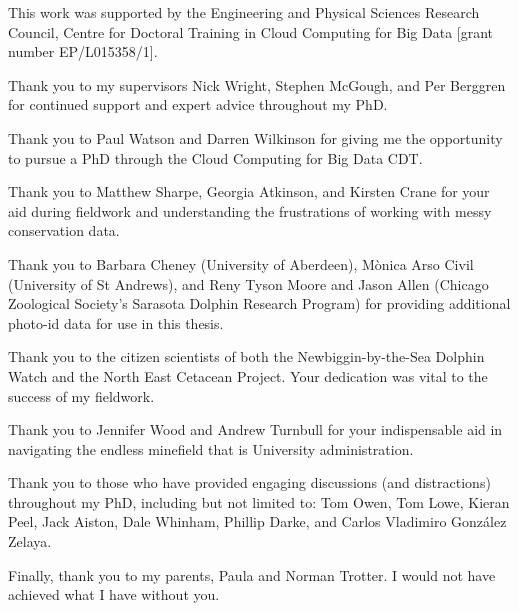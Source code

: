 
\begin{acknowledgements}

This work was supported by the Engineering and Physical Sciences Research Council, Centre for Doctoral Training in Cloud Computing for Big Data [grant number EP/L015358/1]. \newline

\noindent Thank you to my supervisors Nick Wright, Stephen McGough, and Per Berggren for continued support and expert advice throughout my PhD. \newline

\noindent Thank you to Paul Watson and Darren Wilkinson for giving me the opportunity to pursue a PhD through the Cloud Computing for Big Data CDT. \newline

\noindent Thank you to Matthew Sharpe, Georgia Atkinson, and Kirsten Crane for your aid during fieldwork and understanding the frustrations of working with messy conservation data.\newline

\noindent Thank you to Barbara Cheney (University of Aberdeen), M\`{o}nica Arso Civil (University of St Andrews), and Reny Tyson Moore and Jason Allen (Chicago Zoological Society's Sarasota Dolphin Research Program) for providing additional photo-id data for use in this thesis.\newline

\noindent Thank you to the citizen scientists of both the Newbiggin-by-the-Sea Dolphin Watch and the North East Cetacean Project. Your dedication was vital to the success of my fieldwork. \newline

\noindent Thank you to Jennifer Wood and Andrew Turnbull for your indispensable aid in navigating the endless minefield that is University administration.\newline

\noindent Thank you to those who have provided engaging discussions (and distractions) throughout my PhD, including but not limited to: Tom Owen, Tom Lowe, Kieran Peel, Jack Aiston, Dale Whinham, Phillip Darke, and Carlos Vladimiro González Zelaya. \newline

\noindent Finally, thank you to my parents, Paula and Norman Trotter. I would not have achieved what I have without you.

\end{acknowledgements}
